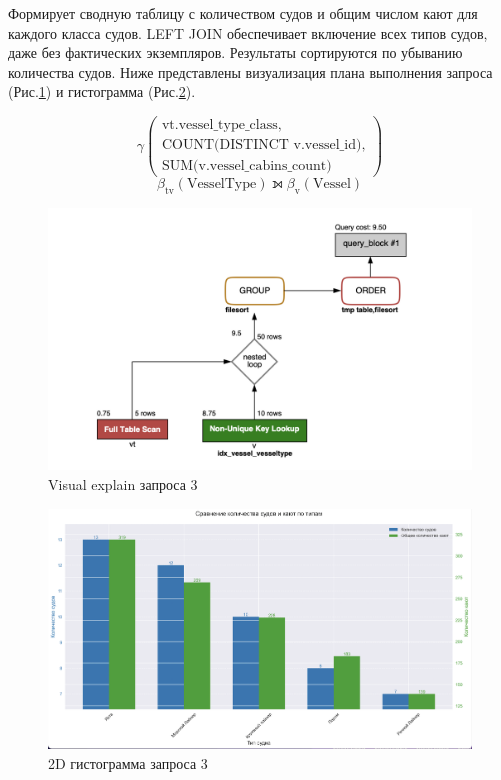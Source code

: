 \documentclass[11pt,a4paper,final]{article}
\begin{document}
Формирует сводную таблицу с количеством судов и общим числом кают для каждого класса судов. LEFT JOIN обеспечивает включение всех типов судов, даже без фактических экземпляров. Результаты сортируются по убыванию количества судов. Ниже представлены визуализация плана выполнения запроса (Рис.\ref{fig:expl3}) и гистограмма (Рис.\ref{fig:hist3}).

$$
\gamma\begin{pmatrix}
\text{vt.vessel\_type\_class}, \\
\text{COUNT(DISTINCT v.vessel\_id)}, \\
\text{SUM(v.vessel\_cabins\_count)}
\end{pmatrix}
$$
$$
\beta_{\text{tv}}(\text{VesselType}) \leftouterjoin \beta_{\text{v}}(\text{Vessel})
$$

\begin{figure}[H]
    \centering
    \includegraphics[width=\textwidth]{33.png} 
    \caption{Visual explain запроса 3}
    \label{fig:expl3}
\end{figure}

\newpage
\begin{figure}[h!]
    \centering
    \includegraphics[width=1.05\textwidth]{52.png} 
    \caption{2D гистограмма  запроса 3}
    \label{fig:hist3}
\end{figure}
\end{document}
